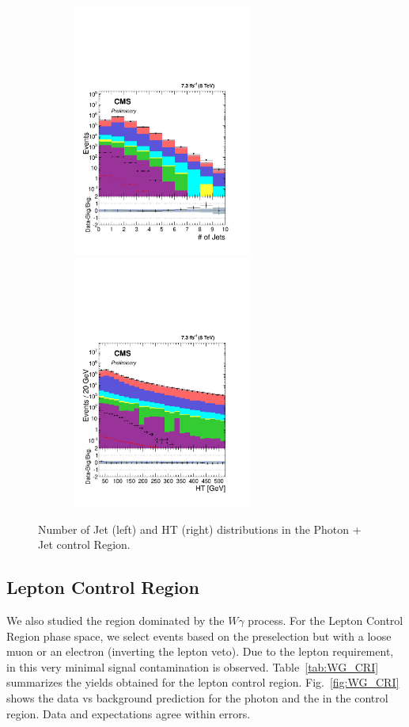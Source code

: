 \begin{figure}[!hp]
 \centering
  {\label{fig:njetfinal}\includegraphics[width=8.3cm,height=8.3cm]{analysis_figs/final_njets.pdf}}
  {\label{fig:HT}\includegraphics[width=8.3cm,height=8.3cm]{analysis_figs/final_HT.pdf}}
 \caption{Number of Jet (left) and HT (right) distributions in the Photon + Jet control Region. }
 \label{fig:control_jet}
\end{figure}


\subsection{Lepton Control Region}

We also studied the region dominated by the $W\gamma$ process. For the Lepton Control Region phase space, we select events based on the preselection but with a loose muon or an electron (inverting the lepton veto). Due to the lepton requirement, in this very minimal signal contamination is observed. Table~\ref{tab:WG_CRI} summarizes the yields obtained for the lepton control region. Fig.~\ref{fig:WG_CRI} shows the data vs background prediction for the photon \pt and the \met in the control region. Data and expectations agree within errors.

